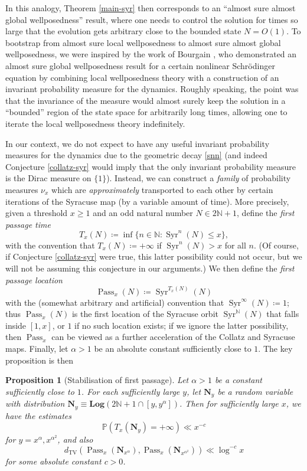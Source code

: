 \documentclass[12pt,a4paper,reqno]{amsart}
\numberwithin{equation}{section}
\theoremstyle{plain}
\newtheorem{proposition}[theorem]{Proposition}
\theoremstyle{definition}
\renewcommand\P{\mathbb{P}}
\newcommand\N{\mathbb{N}}
\newcommand\Log{\mathbf{Log}}
\newcommand\TV{{\operatorname{TV}}}
\newcommand\Pass{{\operatorname{Pass}}}
\newcommand\Syr{{\operatorname{Syr}}}
\begin{document}
In this analogy, Theorem \ref{main-syr} then corresponds to an ``almost sure almost global wellposedness'' result, where one needs to control the solution for times so large that the evolution gets arbitrary close to the bounded state $N=O(1)$.  To bootstrap from almost sure local wellposedness to almost sure almost global wellposedness, we were inspired by the work of Bourgain \cite{bourgain}, who demonstrated an almost sure global wellposedness result for a certain nonlinear Schr\"odinger equation by combining local wellposedness theory with a construction of an invariant probability measure for the dynamics.  Roughly speaking, the point was that the invariance of the measure would almost surely keep the solution in a ``bounded'' region of the state space for arbitrarily long times, allowing one to iterate the local wellposedness theory indefinitely.  

In our context, we do not expect to have any useful invariant probability measures for the dynamics due to the geometric decay \eqref{snn} (and indeed Conjecture \ref{collatz-syr} would imply that the only invariant probability measure is the Dirac measure on $\{1\}$).  Instead, we can construct a \emph{family} of probability measures $\nu_x$ which are \emph{approximately} transported to each other by certain iterations of the Syracuse map (by a variable amount of time).  More precisely,  given a threshold $x \geq 1$ and an odd natural number $N \in 2\N+1$, define the \emph{first passage time}
$$ T_x(N) \coloneqq \inf \{ n \in \N: \Syr^n(N) \leq x \},$$
with the convention that $T_x(N) \coloneqq +\infty$ if $\Syr^n(N) > x$ for all $n$.  (Of course, if Conjecture \ref{collatz-syr} were true, this latter possibility could not occur, but we will not be assuming this conjecture in our arguments.)  We then define the \emph{first passage location}
$$ \Pass_x(N) \coloneqq \Syr^{T_x(N)}(N)$$
with the (somewhat arbitrary and artificial) convention that $\Syr^\infty(N) \coloneqq 1$; thus $\Pass_x(N)$ is the first location of the Syracuse orbit $\Syr^\N(N)$ that falls inside $[1,x]$, or $1$ if no such location exists; if we ignore the latter possibility, then $\Pass_x$ can be viewed as a further acceleration of the Collatz and Syracuse maps.  Finally, let $\alpha>1$ be an absolute constant sufficiently close to $1$. The key proposition is then

\begin{proposition}[Stabilisation of first passage]\label{transport}  Let $\alpha > 1$ be a constant sufficiently close to $1$.  For each sufficiently large $y$, let $\mathbf{N}_y$ be a random variable with distribution $\mathbf{N}_y \equiv \Log( 2\N+1 \cap [y,y^\alpha] )$.  Then for sufficiently large $x$, we have the estimates
\begin{equation}\label{fail}
\P( T_x(\mathbf{N}_y) = +\infty ) \ll x^{-c}
\end{equation}
for $y = x^\alpha, x^{\alpha^2}$, and also
\begin{equation}\label{tv}
d_\TV( \Pass_x( \mathbf{N}_{x^\alpha} ), \Pass_x( \mathbf{N}_{x^{\alpha^2}} ) ) \ll \log^{-c} x
\end{equation}
for some absolute constant $c>0$.
\end{proposition}
\end{document}
